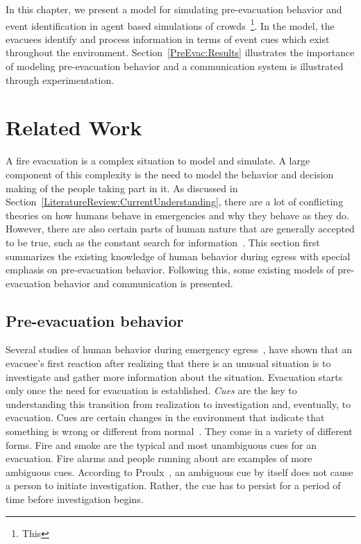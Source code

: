 In this chapter, we present a model for simulating pre-evacuation behavior and event identification in agent based simulations of crowds~\footnote{This}. In the model, the evacuees identify and process information in terms of event cues which exist throughout the environment. Section~\ref{PreEvac:Results} illustrates the importance of modeling pre-evacuation behavior and a communication system is illustrated through experimentation.


\section{Related Work}
\label{PreEvac:LitRev}


A fire evacuation is a complex situation to model and simulate. A large component of this complexity is the need to model the behavior and decision making of the people taking part in it. As discussed in Section~\ref{LiteratureReview:CurrentUnderstanding}, there are a lot of conflicting theories on how humans behave in emergencies and why they behave as they do. However, there are also certain parts of human nature that are generally accepted to be true, such as the constant search for information~\cite{Proulx:2003tc,Tong:1985wn,Ozel:2001tn,Sime:1983uy}. This section first summarizes the existing knowledge of human behavior during egress with special emphasis on pre-evacuation behavior. Following this, some existing models of pre-evacuation behavior and communication is presented.

\subsection{Pre-evacuation behavior}
\label{PreEvac:PreEvacuationBehavior}

Several studies of human behavior during emergency egress~\cite{Kuligowski:2005tt,Ozel:2001tn,Proulx:2007ul}, have shown that an evacuee's first reaction after realizing that there is an unusual situation is to investigate and gather more information about the situation. Evacuation starts only once the need for evacuation is established. \emph{Cues} are the key to understanding this transition from realization to investigation and, eventually, to evacuation. Cues are certain changes in the environment that indicate that something is wrong or different from normal~\cite{Sime:1983uy}. They come in a variety of different forms. Fire and smoke are the typical and most unambiguous cues for an evacuation. Fire alarms and people running about are examples of more ambiguous cues. According to Proulx~\cite{Proulx:2007ul}, an ambiguous cue by itself does not cause a person to initiate investigation. Rather, the cue has to persist for a period of time before investigation begins.

